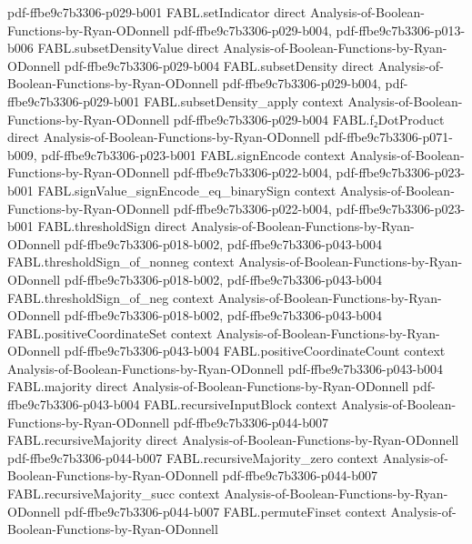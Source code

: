 \begin{theorem}
  {pdf-ffbe9c7b3306-p029-b001}
\proofstep
  {FABL.setIndicator}
  {direct}
  {Analysis-of-Boolean-Functions-by-Ryan-ODonnell}
  {pdf-ffbe9c7b3306-p029-b004,
    pdf-ffbe9c7b3306-p013-b006}
\proofstep
  {FABL.subsetDensityValue}
  {direct}
  {Analysis-of-Boolean-Functions-by-Ryan-ODonnell}
  {pdf-ffbe9c7b3306-p029-b004}
\proofstep
  {FABL.subsetDensity}
  {direct}
  {Analysis-of-Boolean-Functions-by-Ryan-ODonnell}
  {pdf-ffbe9c7b3306-p029-b004,
    pdf-ffbe9c7b3306-p029-b001}
\proofstep
  {FABL.subsetDensity_apply}
  {context}
  {Analysis-of-Boolean-Functions-by-Ryan-ODonnell}
  {pdf-ffbe9c7b3306-p029-b004}
\proofstep
  {FABL.f₂DotProduct}
  {direct}
  {Analysis-of-Boolean-Functions-by-Ryan-ODonnell}
  {pdf-ffbe9c7b3306-p071-b009,
    pdf-ffbe9c7b3306-p023-b001}
\proofstep
  {FABL.signEncode}
  {context}
  {Analysis-of-Boolean-Functions-by-Ryan-ODonnell}
  {pdf-ffbe9c7b3306-p022-b004,
    pdf-ffbe9c7b3306-p023-b001}
\proofstep
  {FABL.signValue_signEncode_eq_binarySign}
  {context}
  {Analysis-of-Boolean-Functions-by-Ryan-ODonnell}
  {pdf-ffbe9c7b3306-p022-b004,
    pdf-ffbe9c7b3306-p023-b001}
\proofstep
  {FABL.thresholdSign}
  {direct}
  {Analysis-of-Boolean-Functions-by-Ryan-ODonnell}
  {pdf-ffbe9c7b3306-p018-b002,
    pdf-ffbe9c7b3306-p043-b004}
\proofstep
  {FABL.thresholdSign_of_nonneg}
  {context}
  {Analysis-of-Boolean-Functions-by-Ryan-ODonnell}
  {pdf-ffbe9c7b3306-p018-b002,
    pdf-ffbe9c7b3306-p043-b004}
\proofstep
  {FABL.thresholdSign_of_neg}
  {context}
  {Analysis-of-Boolean-Functions-by-Ryan-ODonnell}
  {pdf-ffbe9c7b3306-p018-b002,
    pdf-ffbe9c7b3306-p043-b004}
\proofstep
  {FABL.positiveCoordinateSet}
  {context}
  {Analysis-of-Boolean-Functions-by-Ryan-ODonnell}
  {pdf-ffbe9c7b3306-p043-b004}
\proofstep
  {FABL.positiveCoordinateCount}
  {context}
  {Analysis-of-Boolean-Functions-by-Ryan-ODonnell}
  {pdf-ffbe9c7b3306-p043-b004}
\proofstep
  {FABL.majority}
  {direct}
  {Analysis-of-Boolean-Functions-by-Ryan-ODonnell}
  {pdf-ffbe9c7b3306-p043-b004}
\proofstep
  {FABL.recursiveInputBlock}
  {context}
  {Analysis-of-Boolean-Functions-by-Ryan-ODonnell}
  {pdf-ffbe9c7b3306-p044-b007}
\proofstep
  {FABL.recursiveMajority}
  {direct}
  {Analysis-of-Boolean-Functions-by-Ryan-ODonnell}
  {pdf-ffbe9c7b3306-p044-b007}
\proofstep
  {FABL.recursiveMajority_zero}
  {context}
  {Analysis-of-Boolean-Functions-by-Ryan-ODonnell}
  {pdf-ffbe9c7b3306-p044-b007}
\proofstep
  {FABL.recursiveMajority_succ}
  {context}
  {Analysis-of-Boolean-Functions-by-Ryan-ODonnell}
  {pdf-ffbe9c7b3306-p044-b007}
\proofstep
  {FABL.permuteFinset}
  {context}
  {Analysis-of-Boolean-Functions-by-Ryan-ODonnell}

\end{theorem}
